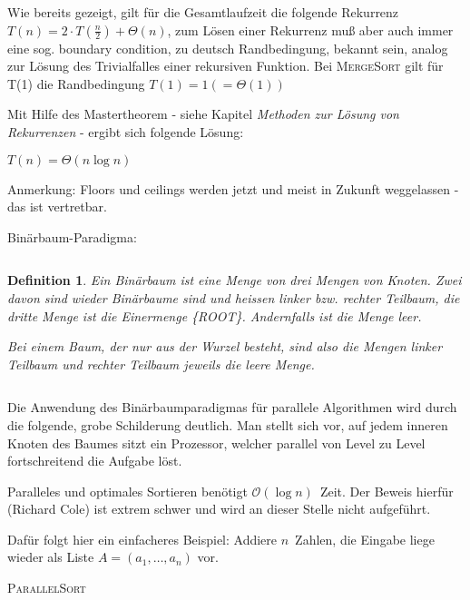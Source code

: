 \documentclass[ngerman,draft,parskip=half*,twoside]{scrreprt}
\theoremstyle{break}
\newtheorem{definition}{Definition}[chapter]
\theoremstyle{nonumberbreak}
\newcommand*{\OO}{\mathcal{O}}      %
\begin{document}
Wie bereits gezeigt, gilt für die Gesamtlaufzeit die folgende Rekurrenz $T(n) = 2\cdot T(\frac{n}{2})+\Theta(n)$, zum Lösen einer
Rekurrenz muß aber auch immer eine sog. boundary condition, zu deutsch Randbedingung, bekannt sein, analog zur Lösung des Trivialfalles einer rekursiven
Funktion. Bei \textsc{MergeSort} gilt für T(1) die Randbedingung $T(1) = 1(=\Theta(1))$

Mit Hilfe des Mastertheorem - siehe Kapitel \textit{Methoden zur Lösung von Rekurrenzen} - ergibt sich folgende Lösung:

$T(n) = \Theta(n \log n)$ 

Anmerkung: Floors und ceilings werden jetzt und meist in Zukunft weggelassen - das ist vertretbar.

\begin{description}
	\item [Binärbaum-Paradigma:] 
\end{description}
	
$  $

\begin{definition}
  Ein Binärbaum ist eine Menge von drei Mengen von Knoten. Zwei davon
  sind wieder Binärbaume sind und heissen linker bzw.  rechter
  Teilbaum, die dritte Menge ist die Einermenge \{ROOT\}. Andernfalls
  ist die Menge leer.
	  
  Bei einem Baum, der nur aus der Wurzel besteht, sind also die Mengen
  linker Teilbaum und rechter Teilbaum jeweils die leere Menge.
\end{definition}

$  $

Die Anwendung des Binärbaumparadigmas für parallele Algorithmen wird durch die folgende, grobe Schilderung deutlich.
Man stellt sich vor, auf jedem inneren Knoten des Baumes sitzt ein Prozessor, welcher parallel von Level zu Level fortschreitend die
Aufgabe löst.

Paralleles und optimales Sortieren benötigt $\OO(\log n)$~Zeit. Der Beweis hierfür (Richard Cole) ist extrem schwer und wird an dieser Stelle nicht aufgeführt.

Dafür folgt hier ein einfacheres Beispiel: Addiere $n$~Zahlen, die
Eingabe liege wieder als Liste $A=(a_1,\ldots,a_n)$ vor.

\begin{algorithm}
\caption{\textsc{ParallelSort}}
\end{algorithm}
\end{document}
